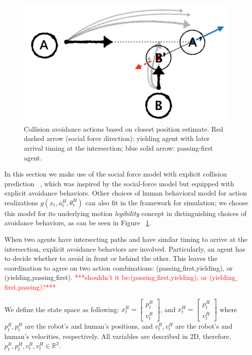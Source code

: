 \documentclass[letterpaper, 10 pt, conference]{ieeeconf}  %
\begin{document}
   \begin{figure}[t]
      \centering
      \vspace{-1em}
      \includegraphics[scale=0.27]{pedestrian_avoidance}
      \vspace{-1em}
      \caption{Collision avoidance actions based on closest position estimate. 
      Red dashed arrow (social force direction): yielding agent with later 
      arrival timing at the intersection; blue solid arrow: passing-first agent. }
      \vspace{-1.5em}
     \label{fig:legibility}
   \end{figure}

In this section we make use of the social force model with explicit collision prediction ~\cite{zanlungo2011social}, which was inspired by the social-force model but equipped with explicit avoidance behaviors. Other choices of human behavioral model for action realizations 
$g(x_t,a^H_t,\theta^H_t)$ can also fit in the framework for simulation; we choose this model for its underlying motion \textit{legibility} concept in distinguishing choices of avoidance behaviors, as can be seen in Figure ~\ref{fig:legibility}.  

When two agents have intersecting paths and have similar timing to arrive at the intersection, explicit avoidance behaviors are involved. Particularly, an agent has to decide whether to avoid in front or behind the other. This leaves the coordination to agree on two action combinations: (passing$\_$first,yielding), or (yielding,passing$\_$first). \textcolor{red}{***shouldn't it be:(passing$\_$first,yielding), or (yielding$\_$first,passing)?***}

We define the state space as following: $x_t^R = \begin{bmatrix}
p^R_t\\
v^R_t
\end{bmatrix}$, and $x_t^H = \begin{bmatrix}
p^H_t\\
v^H_t
\end{bmatrix}$
where $p^R_t, p^H_t$ are the robot's and human's positions, and $v^R_t,v^H_t$ are the robot's and human's velocities, respectively. All variables are described in 2D, therefore, $p^R_t,p^H_t,v^R_t,v^H_t \in \mathbb{R}^2$. 
\end{document}
